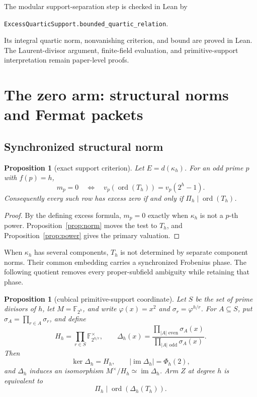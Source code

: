 \documentclass[11pt]{article}
\newtheorem{proposition}[theorem]{Proposition}
\theoremstyle{definition}
\theoremstyle{remark}
\begin{document}
The modular support-separation step is checked in Lean by
\begin{center}
\texttt{ExcessQuarticSupport.bounded\_quartic\_relation}.
\end{center}
Its integral quartic norm, nonvanishing criterion, and bound are proved in
Lean. The Laurent-divisor argument, finite-field evaluation, and
primitive-support interpretation remain paper-level proofs.

\section{The zero arm: structural norms and Fermat packets}\label{sec:z}

\subsection{Synchronized structural norm}

\begin{proposition}[exact support criterion]\label{prop:z-support}
Let $E=d(\kappa_h)$.  For an odd prime $p$ with $f(p)=h$,
\[
 m_p=0
 \quad\Longleftrightarrow\quad
 v_p(\operatorname{ord}(T_h))=v_p(2^h-1).
\]
Consequently every such row has excess zero if and only if
$\Pi_h\mid\operatorname{ord}(T_h)$.
\end{proposition}

\begin{proof}
By the defining excess formula, $m_p=0$ exactly when $\kappa_h$ is not a $p$-th
power.  Proposition~\ref{prop:norm} moves the test to $T_h$, and
Proposition~\ref{prop:power} gives the primary valuation.
\end{proof}

When $\kappa_h$ has several components, $T_h$ is not determined by separate
component norms.  Their common embedding carries a synchronized Frobenius
phase.  The following quotient removes every proper-subfield ambiguity while
retaining that phase.

\begin{proposition}[cubical primitive-support coordinate]
\label{prop:cube}
Let $S$ be the set of prime divisors of $h$, let
$M=\mathbb F_{2^h}$, and write $\varphi(x)=x^2$ and
$\sigma_r=\varphi^{h/r}$.  For $A\subseteq S$, put
$\sigma_A=\prod_{r\in A}\sigma_r$, and define
\[
 H_h=\prod_{r\in S}\mathbb F_{2^{h/r}}^{\times},
 \qquad
 \Delta_h(x)=
 \frac{\prod_{|A|\text{ even}}\sigma_A(x)}
      {\prod_{|A|\text{ odd}}\sigma_A(x)}.
\]
Then
\[
 \ker\Delta_h=H_h,
 \qquad |\operatorname{im}\Delta_h|=\Phi_h(2),
\]
and $\Delta_h$ induces an isomorphism
$M^{\times}/H_h\simeq\operatorname{im}\Delta_h$.  Arm $Z$ at degree $h$
is equivalent to
\[
  \Pi_h\mid\operatorname{ord}(\Delta_h(T_h)).
\]
\end{proposition}
\end{document}
